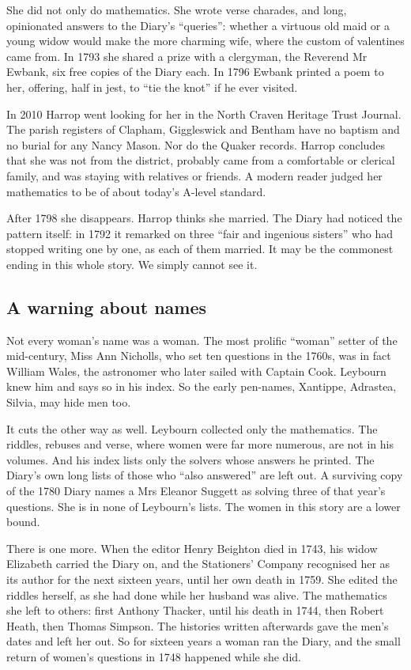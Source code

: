 \documentclass[11pt,a4paper]{article}
\begin{document}
She did not only do mathematics. She wrote verse charades, and long,
opinionated answers to the Diary's ``queries'': whether a virtuous old
maid or a young widow would make the more charming wife, where the
custom of valentines came from. In 1793 she shared a prize with a
clergyman, the Reverend Mr Ewbank, six free copies of the Diary each. In
1796 Ewbank printed a poem to her, offering, half in jest, to ``tie the
knot'' if he ever visited.

In 2010 Harrop went looking for her in the North Craven Heritage Trust
Journal. The parish registers of Clapham, Giggleswick and Bentham have
no baptism and no burial for any Nancy Mason. Nor do the Quaker records.
Harrop concludes that she was not from the district, probably came from
a comfortable or clerical family, and was staying with relatives or
friends. A modern reader judged her mathematics to be of about today's
A-level standard.

After 1798 she disappears. Harrop thinks she married. The Diary had
noticed the pattern itself: in 1792 it remarked on three ``fair and
ingenious sisters'' who had stopped writing one by one, as each of them
married. It may be the commonest ending in this whole story. We simply
cannot see it.

\hypertarget{a-warning-about-names}{%
\subsection{A warning about names}\label{a-warning-about-names}}

Not every woman's name was a woman. The most prolific ``woman'' setter
of the mid-century, Miss Ann Nicholls, who set ten questions in the
1760s, was in fact William Wales, the astronomer who later sailed with
Captain Cook. Leybourn knew him and says so in his index. So the early
pen-names, Xantippe, Adrastea, Silvia, may hide men too.

It cuts the other way as well. Leybourn collected only the mathematics.
The riddles, rebuses and verse, where women were far more numerous, are
not in his volumes. And his index lists only the solvers whose answers
he printed. The Diary's own long lists of those who ``also answered''
are left out. A surviving copy of the 1780 Diary names a Mrs Eleanor
Suggett as solving three of that year's questions. She is in none of
Leybourn's lists. The women in this story are a lower bound.

There is one more. When the editor Henry Beighton died in 1743, his
widow Elizabeth carried the Diary on, and the Stationers' Company
recognised her as its author for the next sixteen years, until her own
death in 1759. She edited the riddles herself, as she had done while her
husband was alive. The mathematics she left to others: first Anthony
Thacker, until his death in 1744, then Robert Heath, then Thomas
Simpson. The histories written afterwards gave the men's dates and left
her out. So for sixteen years a woman ran the Diary, and the small
return of women's questions in 1748 happened while she did.
\end{document}
